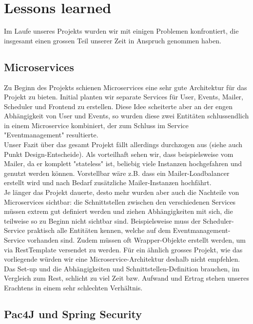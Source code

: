 \documentclass[11pt]{article} %
\begin{document}
\newpage
\section{Lessons learned}
Im Laufe unseres Projekts wurden wir mit einigen Problemen konfrontiert, die insgesamt einen grossen Teil unserer Zeit in Anspruch genommen haben.

\subsection{Microservices}
Zu Beginn des Projekts schienen Microservices eine sehr gute Architektur für das Projekt zu bieten. Initial planten wir separate Services für User, Events, Mailer, Scheduler und Frontend zu erstellen. Diese Idee scheiterte aber an der engen Abhängigkeit von User und Events, so wurden diese zwei Entitäten schlussendlich in einem Microservice kombiniert, der zum Schluss im Service "Eventmanagement" resultierte.
\\
Unser Fazit über das gesamt Projekt fällt allerdings durchzogen aus (siehe auch Punkt Design-Entscheide). Als vorteilhaft sehen wir, dass beispielsweise vom Mailer, da er komplett "stateless" ist, beliebig viele Instanzen hochgefahren und genutzt werden können. Vorstellbar wäre z.B. dass ein Mailer-Loadbalancer erstellt wird und nach Bedarf zusätzliche Mailer-Instanzen hochfährt.
\\
Je länger das Projekt dauerte, desto mehr wurden aber auch die Nachteile von Microservices sichtbar: die Schnittstellen zwischen den verschiedenen Services müssen extrem gut definiert werden und ziehen Abhängigkeiten mit sich, die teilweise so zu Beginn nicht sichtbar sind. Beispielsweise muss der Scheduler-Service praktisch alle Entitäten kennen, welche auf dem Eventmanagement-Service vorhanden sind. Zudem müssen oft Wrapper-Objekte erstellt werden, um via RestTemplate versendet zu werden. Für ein ähnlich grosses Projekt, wie das vorliegende würden wir eine Microservice-Architektur deshalb nicht empfehlen. Das Set-up und die Abhängigkeiten und Schnittstellen-Definition brauchen, im Vergleich zum Rest, schlicht zu viel Zeit bzw. Aufwand und Ertrag stehen unseres Erachtens in einem sehr schlechten Verhältnis.
\subsection{Pac4J und Spring Security}
\end{document}
